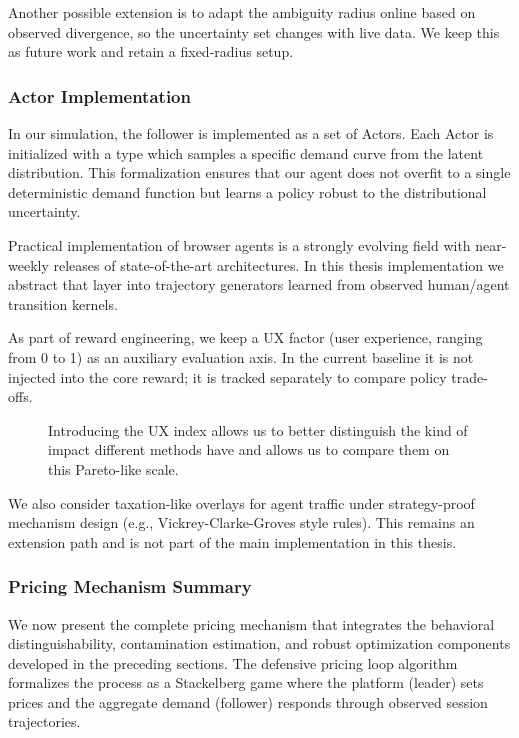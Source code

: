 Another possible extension is to adapt the ambiguity radius online based on observed divergence, so the uncertainty set changes with live data. We keep this as future work and retain a fixed-radius setup.

\subsubsection{Actor Implementation}

In our simulation, the follower is implemented as a set of Actors. Each Actor is initialized with a type which samples a specific demand curve from the latent distribution. This formalization ensures that our agent does not overfit to a single deterministic demand function but learns a policy robust to the distributional uncertainty.

Practical implementation of browser agents is a strongly evolving field with near-weekly releases of state-of-the-art architectures. In this thesis implementation we abstract that layer into trajectory generators learned from observed human/agent transition kernels.

As part of reward engineering, we keep a UX factor (user experience, ranging from 0 to 1) as an auxiliary evaluation axis. In the current baseline it is not injected into the core reward; it is tracked separately to compare policy trade-offs.

\begin{figure}[ht]
  \centering
  \resizebox{0.5\columnwidth}{!}{%
    
  }
  \caption{Introducing the UX index allows us to better distinguish the kind of impact different methods have and allows us to compare them on this Pareto-like scale.}
\end{figure}

We also consider taxation-like overlays for agent traffic under strategy-proof mechanism design (e.g., Vickrey-Clarke-Groves style rules). This remains an extension path and is not part of the main implementation in this thesis.

\subsubsection{Pricing Mechanism Summary}

We now present the complete pricing mechanism that integrates the behavioral distinguishability, contamination estimation, and robust optimization components developed in the preceding sections. The defensive pricing loop algorithm formalizes the process as a Stackelberg game where the platform (leader) sets prices and the aggregate demand (follower) responds through observed session trajectories.

